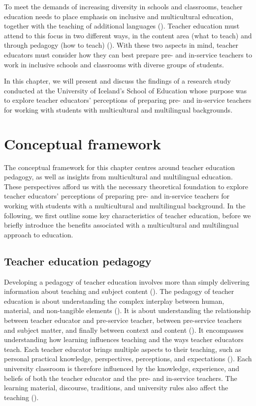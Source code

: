 \documentclass[output=paper]{langscibook}
\begin{document}
To meet the demands of increasing diversity in schools and classrooms, teacher education needs to place emphasis on inclusive and multicultural education, together with the teaching of additional languages (\citealt{Banks2016,Ladson-billings1995-multicultural}). Teacher education must attend to this focus in two different ways, in the content area (what to teach) and through pedagogy (how to teach) (\citealt{European_agency_for_special_needs_and_inclusive_education2011}). With these two aspects in mind, teacher educators must consider how they can best prepare pre- and in-service teachers to work in inclusive schools and classrooms with diverse groups of students.

In this chapter, we will present and discuss the findings of a research study conducted at the University of Iceland’s School of Education whose purpose was to explore teacher educators’ perceptions of preparing pre- and in-service teachers for working with students with multicultural and multilingual backgrounds.

\section{Conceptual framework}
\begin{sloppypar}
The conceptual framework for this chapter centres around teacher education pedagogy, as well as insights from multicultural and multilingual education. These perspectives afford us with the necessary theoretical foundation to explore teacher educators’ perceptions of preparing pre- and in-service teachers for working with students with a multicultural and multilingual background. In the following, we first outline some key characteristics of teacher education, before we briefly introduce the benefits associated with a multicultural and multilingual approach to education. 
\end{sloppypar}

\subsection{Teacher education pedagogy}

Developing a pedagogy of teacher education involves more than simply delivering information about teaching and subject content (\citealt{Loughran2005}). The pedagogy of teacher education is about understanding the complex interplay between human, material, and non-tangible elements (\citealt{Hordvik2020-1}){. It is about understanding the relationship between teacher educator and pre-service teacher, between pre-service teachers and subject matter, and finally between context and content} (\citealt{Loughran2013}){.} {It encompasses understanding how learning influences teaching and the ways teacher educators teach. Each teacher educator brings multiple aspects to their teaching, such as personal practical knowledge, perspectives, perceptions, and expectations} (\citealt{Russell2007}){. Each university classroom is therefore influenced by the knowledge, experience, and beliefs of both the teacher educator and the pre- and in-service teachers. The learning material, discourse, traditions, and university rules also affect the teaching} (\citealt{Loughran2014}){.}
\end{document}
